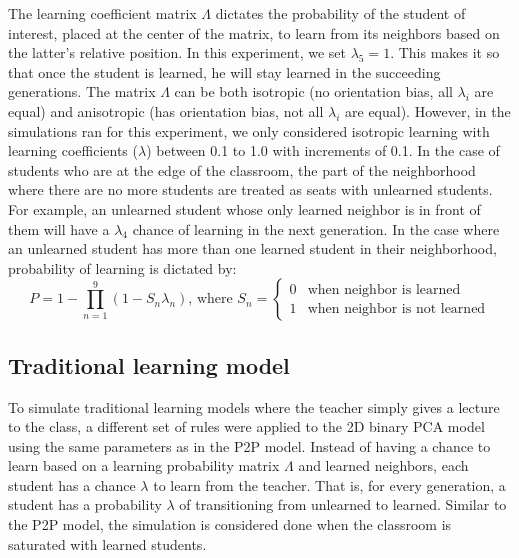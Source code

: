 \documentclass[10pt,a4paper,twoside]{article}
\begin{document}
\noindent The learning coefficient matrix $\Lambda$ dictates the probability of the student of interest, placed at the center of the matrix, to learn from its neighbors based on the latter's relative position. In this experiment, we set $\lambda_5 = 1$. This makes it so that once the student is learned, he will stay learned in the succeeding generations. The matrix $\Lambda$ can be both isotropic (no orientation bias, all $\lambda_i$ are equal) and anisotropic (has orientation bias, not all $\lambda_i$ are equal). However, in the simulations ran for this experiment, we only considered isotropic learning with learning coefficients ($\lambda$) between 0.1 to 1.0 with increments of 0.1.  In the case of students who are at the edge of the classroom, the part of the neighborhood where there are no more students are treated as seats with unlearned students. For example, an unlearned student whose only learned neighbor is in front of them will have a $\lambda_4$ chance of learning in the next generation. In the case where an unlearned student has more than one learned student in their neighborhood, probability of learning is dictated by:
\begin{equation}
  P = 1 - \prod_{n=1}^{9}{(1-S_n\lambda_n)}
  \text{, where } S_n=
  \begin{cases}
    0 & \text{when neighbor is learned}\\
    1 & \text{when neighbor is not learned}
  \end{cases}
  \label{eq:learning probability}
\end{equation}

\subsection{Traditional learning model}
To simulate traditional learning models where the teacher simply gives a lecture to the class, a different set of rules were applied to the 2D binary PCA model using the same parameters as in the P2P model. Instead of having a chance to learn based on a learning probability matrix $\Lambda$ and learned neighbors, each student has a chance $\lambda$ to learn from the teacher. That is, for every generation, a student has a probability $\lambda$ of transitioning from unlearned to learned. Similar to the P2P model, the simulation is considered done when the classroom is saturated with learned students.
\end{document}
